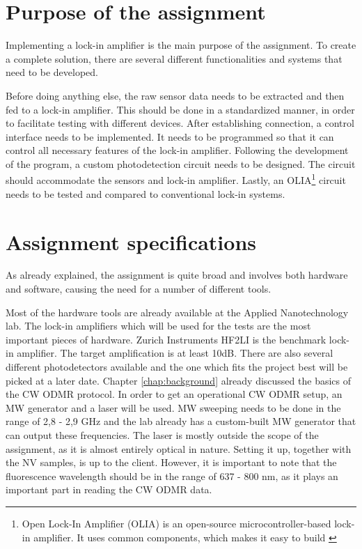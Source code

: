 \section{Purpose of the assignment}\label{purpose}
Implementing a lock-in amplifier is the main purpose of the assignment. To create a complete solution, there are several different functionalities and systems that need to be developed. 

Before doing anything else, the raw sensor data needs to be extracted and then fed to a lock-in amplifier. This should be done in a standardized manner, in order to facilitate testing with different devices. After establishing connection, a control interface needs to be implemented. It needs to be programmed so that it can control all necessary features of the lock-in amplifier. Following the development of the program, a custom photodetection circuit needs to be designed. The circuit should accommodate the sensors and lock-in amplifier. Lastly, an OLIA\footnote{Open Lock-In Amplifier (OLIA) is an open-source microcontroller-based lock-in amplifier. It uses common components, which makes it easy to build \cite{harvie2023olia}} circuit needs to be tested and compared to conventional lock-in systems. 


\section{Assignment specifications}\label{specifications}
As already explained, the assignment is quite broad and involves both hardware and software, causing the need for a number of different tools. 

Most of the hardware tools are already available at the Applied Nanotechnology lab. The lock-in amplifiers which will be used for the tests are the most important pieces of hardware. Zurich Instruments HF2LI is the benchmark lock-in amplifier. The target amplification is at least 10dB. There are also several different photodetectors available and the one which fits the project best will be picked at a later date. Chapter \ref{chap:background} already discussed the basics of the CW ODMR protocol. In order to get an operational CW ODMR setup, an MW generator and a laser will be used. MW sweeping needs to be done in the range of 2,8 - 2,9 GHz and the lab already has a custom-built MW generator that can output these frequencies. The laser is mostly outside the scope of the assignment, as it is almost entirely optical in nature. Setting it up, together with the NV samples, is up to the client. However, it is important to note that the fluorescence wavelength should be in the range of 637 - 800 nm, as it plays an important part in reading the CW ODMR data.
	
